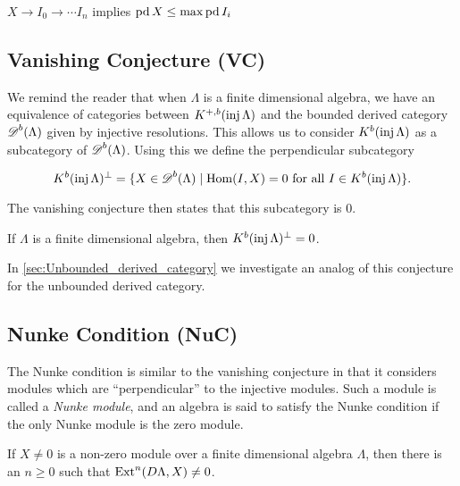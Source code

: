 
$X \to I_0 \to \cdots I_n$ implies $\operatorname{pd} X \leq \max \operatorname{pd} I_i$

\subsection*{Vanishing Conjecture (VC)}

We remind the reader that when $\Lambda$ is a finite dimensional algebra, we have an equivalence of categories between $K^{+,b}(\operatorname{inj}\Lambda)$ and the bounded derived category $\operatorname{\mathscr{D}}^b(\Lambda)$ given by injective resolutions. This allows us to consider $K^b(\operatorname{inj}\Lambda)$ as a subcategory of $\operatorname{\mathscr{D}}^b(\Lambda)$. Using this we define the perpendicular subcategory

$$K^b(\operatorname{inj}\Lambda)^\perp = \{X \in \operatorname{\mathscr{D}}^b(\Lambda) \mid \operatorname{Hom}(I, X)=0 \text{ for all } I \in K^b(\operatorname{inj}\Lambda)\}.$$

The vanishing conjecture then states that this subcategory is 0.
\begin{conj} 
	If $\Lambda$ is a finite dimensional algebra, then $K^b(\operatorname{inj}\Lambda)^\perp = 0$.
\end{conj}

In \cref{sec:Unbounded_derived_category} we investigate an analog of this conjecture for the unbounded derived category.

\subsection*{Nunke Condition (NuC)}
The Nunke condition is similar to the vanishing conjecture in that it considers modules which are ``perpendicular'' to the injective modules. Such a module is called a \emph{Nunke module}, and an algebra is said to satisfy the Nunke condition if the only Nunke module is the zero module.

\begin{conj} 
	If $X \neq 0$ is a non-zero module over a finite dimensional algebra $\Lambda$, then there is an $n \geq 0$ such that $\operatorname{Ext}^n(D\Lambda, X) \neq 0$. 
\end{conj}

